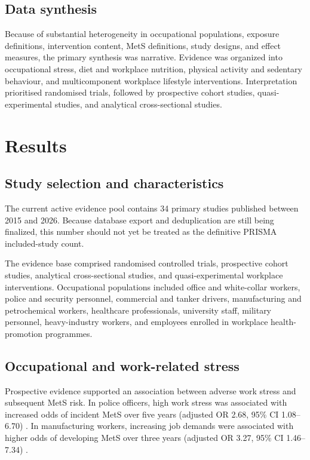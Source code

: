 \documentclass[11pt]{article}
\begin{document}
\subsection{Data synthesis}

Because of substantial heterogeneity in occupational populations, exposure definitions, intervention content, MetS definitions, study designs, and effect measures, the primary synthesis was narrative. Evidence was organized into occupational stress, diet and workplace nutrition, physical activity and sedentary behaviour, and multicomponent workplace lifestyle interventions. Interpretation prioritised randomised trials, followed by prospective cohort studies, quasi-experimental studies, and analytical cross-sectional studies.

\section{Results}

\subsection{Study selection and characteristics}

The current active evidence pool contains 34 primary studies published between 2015 and 2026. Because database export and deduplication are still being finalized, this number should not yet be treated as the definitive PRISMA included-study count.

The evidence base comprised randomised controlled trials, prospective cohort studies, analytical cross-sectional studies, and quasi-experimental workplace interventions. Occupational populations included office and white-collar workers, police and security personnel, commercial and tanker drivers, manufacturing and petrochemical workers, healthcare professionals, university staff, military personnel, heavy-industry workers, and employees enrolled in workplace health-promotion programmes.



\subsection{Occupational and work-related stress}

Prospective evidence supported an association between adverse work stress and subsequent MetS risk. In police officers, high work stress was associated with increased odds of incident MetS over five years (adjusted OR 2.68, 95\% CI 1.08--6.70) \citep{Garbarino2015}. In manufacturing workers, increasing job demands were associated with higher odds of developing MetS over three years (adjusted OR 3.27, 95\% CI 1.46--7.34) \citep{Yamaguchi2018}.
\end{document}
